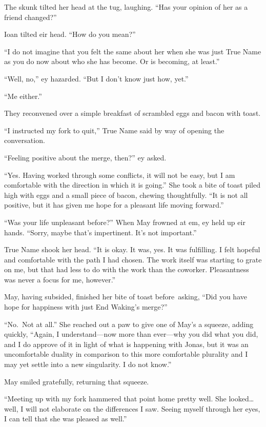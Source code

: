 The skunk tilted her head at the tug, laughing. ``Has your opinion of her as a friend changed?''

Ioan tilted eir head. ``How do you mean?''

``I do not imagine that you felt the same about her when she was just True Name as you do now about who she has become. Or is becoming, at least.''

``Well, no,'' ey hazarded. ``But I don't know just how, yet.''

``Me either.''

They reconvened over a simple breakfast of scrambled eggs and bacon with toast.

``I instructed my fork to quit,'' True Name said by way of opening the conversation.

``Feeling positive about the merge, then?'' ey asked.

``Yes. Having worked through some conflicts, it will not be easy, but I am comfortable with the direction in which it is going.'' She took a bite of toast piled high with eggs and a small piece of bacon, chewing thoughtfully. ``It is not all positive, but it has given me hope for a pleasant life moving forward.''

``Was your life unpleasant before?'' When May frowned at em, ey held up eir hands. ``Sorry, maybe that's impertinent. It's not important.''

True Name shook her head. ``It is okay. It was, yes. It was fulfilling. I felt hopeful and comfortable with the path I had chosen. The work itself was starting to grate on me, but that had less to do with the work than the coworker. Pleasantness was never a focus for me, however.''

May, having subsided, finished her bite of toast before\pagebreak\ asking, ``Did you have hope for happiness with just End Waking's merge?''

``No.~Not at all.'' She reached out a paw to give one of May's a squeeze, adding quickly, ``Again, I understand—now more than ever—why you did what you did, and I do approve of it in light of what is happening with Jonas, but it was an uncomfortable duality in comparison to this more comfortable plurality and I may yet settle into a new singularity. I do not know.''

May smiled gratefully, returning that squeeze.

``Meeting up with my fork hammered that point home pretty well. She looked\ldots well, I will not elaborate on the differences I saw. Seeing myself through her eyes, I can tell that she was pleased as well.''

